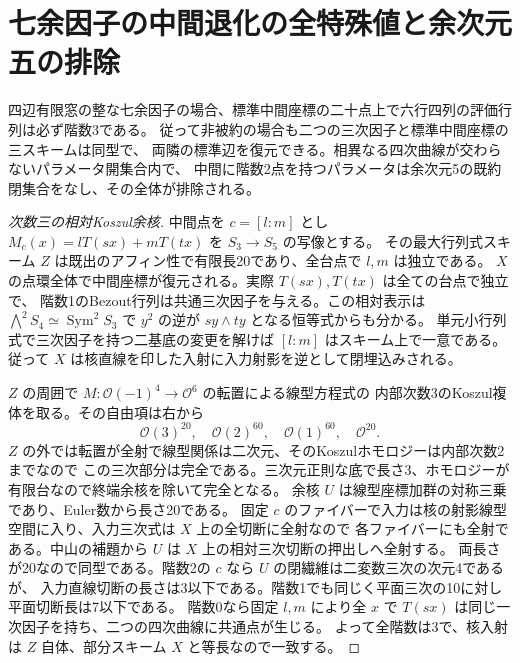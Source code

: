 \section{七余因子の中間退化の全特殊値と余次元五の排除}
\label{sec:trisecant-middle-degeneracy}
\begin{theorem}\label{thm:trisecant-middle-degeneracy}
四辺有限窓の整な七余因子の場合、標準中間座標の二十点上で六行四列の評価行列は必ず階数3である。
従って非被約の場合も二つの三次因子と標準中間座標の三スキームは同型で、
両隣の標準辺を復元できる。相異なる四次曲線が交わらないパラメータ開集合内で、
中間に階数2点を持つパラメータは余次元5の既約閉集合をなし、その全体が排除される。
\end{theorem}
\begin{proof}[次数三の相対Koszul余核]
中間点を $c=[l:m]$ とし $M_c(x)=l T(sx)+m T(tx)$ を $S_3\to S_5$ の写像とする。
その最大行列式スキーム $Z$ は既出のアフィン性で有限長20であり、全台点で $l,m$ は独立である。
$X$ の点環全体で中間座標が復元される。実際 $T(sx),T(tx)$ は全ての台点で独立で、
階数1のBezout行列は共通三次因子を与える。この相対表示は
$\bigwedge^2 S_4\simeq\operatorname{Sym}^2 S_3$ で $y^2$ の逆が $sy\wedge ty$ となる恒等式からも分かる。
単元小行列式で三次因子を持つ二基底の変更を解けば $[l:m]$ はスキーム上で一意である。
従って $X$ は核直線を印した入射に入力射影を逆として閉埋込みされる。

$Z$ の周囲で $M:\mathcal O(-1)^4\to\mathcal O^6$ の転置による線型方程式の
内部次数3のKoszul複体を取る。その自由項は右から
\[
              \mathcal O(3)^{20},\quad \mathcal O(2)^{60},\quad
              \mathcal O(1)^{60},\quad \mathcal O^{20}.
\]
$Z$ の外では転置が全射で線型関係は二次元、そのKoszulホモロジーは内部次数2までなので
この三次部分は完全である。三次元正則な底で長さ3、ホモロジーが有限台なので終端余核を除いて完全となる。
余核 $U$ は線型座標加群の対称三乗であり、Euler数から長さ20である。
固定 $c$ のファイバーで入力は核の射影線型空間に入り、入力三次式は $X$ 上の全切断に全射なので
各ファイバーにも全射である。中山の補題から $U$ は $X$ 上の相対三次切断の押出しへ全射する。
両長さが20なので同型である。階数2の $c$ なら $U$ の閉繊維は二変数三次の次元4であるが、
入力直線切断の長さは3以下である。階数1でも同じく平面三次の10に対し平面切断長は7以下である。
階数0なら固定 $l,m$ により全 $x$ で $T(sx)$ は同じ一次因子を持ち、二つの四次曲線に共通点が生じる。
よって全階数は3で、核入射は $Z$ 自体、部分スキーム $X$ と等長なので一致する。
\end{proof}


